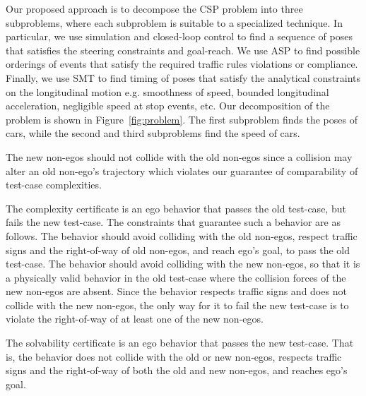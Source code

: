 Our proposed approach is to decompose the CSP problem into three subproblems, where each subproblem is suitable to a specialized technique.
%
In particular, we use simulation and closed-loop control to find a sequence of poses that satisfies the steering constraints and goal-reach.
%
We use ASP to find possible orderings of events that satisfy the required traffic rules violations or compliance.
%
Finally, we use SMT to find timing of poses that satisfy the analytical constraints on the longitudinal motion e.g. smoothness of speed, bounded longitudinal acceleration, negligible speed at stop events, etc.
%
Our decomposition of the problem is shown in Figure~\ref{fig:problem}.
%
The first subproblem finds the poses of cars, while the second and third subproblems find the speed of cars.


The new non-egos should not collide with the old non-egos since a collision may alter an old non-ego's trajectory which violates our guarantee of comparability of test-case complexities.


The complexity certificate is an ego behavior that passes the old test-case, but fails the new test-case.
%
The constraints that guarantee such a behavior are as follows.
%
The behavior should avoid colliding with the old non-egos, respect traffic signs and the right-of-way of old non-egos, and reach ego's goal, to pass the old test-case.
%
The behavior should avoid colliding with the new non-egos, so that it is a physically valid behavior in the old test-case where the collision forces of the new non-egos are absent.
%
Since the behavior respects traffic signs and does not collide with the new non-egos, the only way for it to fail the new test-case is to violate the right-of-way of at least one of the new non-egos.


The solvability certificate is an ego behavior that passes the new test-case.
%
That is, the behavior does not collide with the old or new non-egos, respects traffic signs and the right-of-way of both the old and new non-egos, and reaches ego's goal.






